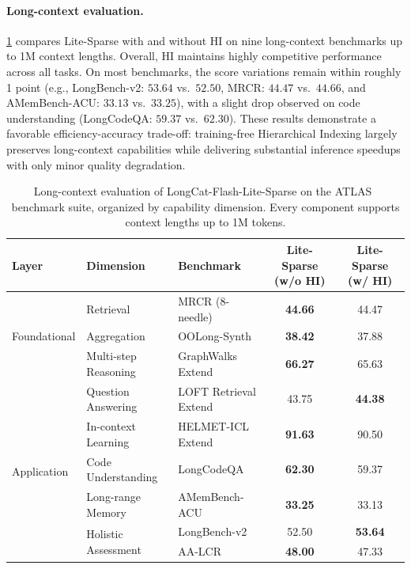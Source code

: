 \documentclass{article}
\begin{document}
\paragraph{Long-context evaluation.}

\cref{tab:release_longctx} compares Lite-Sparse with and without HI on nine long-context benchmarks up to 1M context lengths. Overall, HI maintains highly competitive performance across all tasks. On most benchmarks, the score variations remain within roughly 1 point (e.g., LongBench-v2: \(53.64\) vs.\ \(52.50\), MRCR: \(44.47\) vs.\ \(44.66\), and AMemBench-ACU: \(33.13\) vs.\ \(33.25\)), with a slight drop observed on code understanding (LongCodeQA: \(59.37\) vs.\ \(62.30\)). These results demonstrate a favorable efficiency-accuracy trade-off: training-free Hierarchical Indexing largely preserves long-context capabilities while delivering substantial inference speedups with only minor quality degradation.

\begin{table}[htbp]
\centering
\caption{Long-context evaluation of LongCat-Flash-Lite-Sparse on the ATLAS~\citep{huang2026atlas} benchmark suite, organized by capability dimension. Every component supports context lengths up to 1M tokens.}
\label{tab:release_longctx}
\small
\setlength{\tabcolsep}{10pt}
\begin{tabular}{lll|cc}
\toprule
\textbf{Layer} & \textbf{Dimension} & \textbf{Benchmark} & \textbf{Lite-Sparse (w/o HI)} & \textbf{Lite-Sparse (w/ HI)} \\
\midrule
\multirow{3}{*}{Foundational}
 & Retrieval     & MRCR (8-needle)                     & \textbf{44.66} & 44.47 \\
 & Aggregation   & OOLong-Synth                        & \textbf{38.42} & 37.88 \\
 & Multi-step Reasoning & GraphWalks Extend            & \textbf{66.27} & 65.63 \\
\midrule
\multirow{6}{*}{Application}
 & Question Answering & LOFT Retrieval Extend          & 43.75 & \textbf{44.38} \\
 & In-context Learning & HELMET-ICL Extend            & \textbf{91.63} & 90.50 \\
 & Code Understanding & LongCodeQA                     & \textbf{62.30} & 59.37 \\
 & Long-range Memory & AMemBench-ACU                   & \textbf{33.25} & 33.13 \\
 & \multirow{2}{*}{Holistic Assessment}
                 & LongBench-v2                        & 52.50 & \textbf{53.64} \\
 &               & AA-LCR                              & \textbf{48.00} & 47.33 \\
\bottomrule
\end{tabular}
\end{table}
\end{document}
